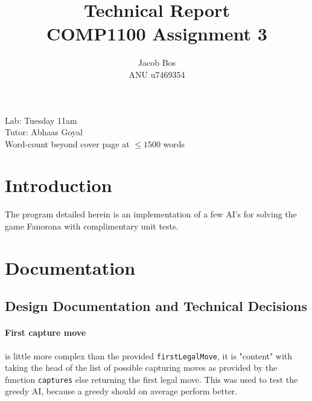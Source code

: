 \documentclass[11pt]{article}
\title{Technical Report\\ COMP1100 Assignment 3}
\author{Jacob Bos\\ ANU u7469354}
\begin{document}
\maketitle
{}
\begin{center}
  Lab: Tuesday 11am\\
  Tutor: Abhaas Goyal\\
  Word-count beyond cover page at $\leq 1500$ words
\end{center}
\tableofcontents
\newpage
{}
\section{Introduction} 
The program detailed herein is an implementation of a few AI's for solving the game Fanorona with complimentary unit tests.


\section{Documentation}%
\subsection{Design Documentation and Technical Decisions}
\paragraph*{First capture move} is little more complex than the provided \verb|firstLegalMove|, it is "content" with taking the head of the list of possible capturing moves as provided by the function \verb|captures| else returning the first legal move. This was used to test the greedy AI, because a greedy should on average perform better.
\end{document}
